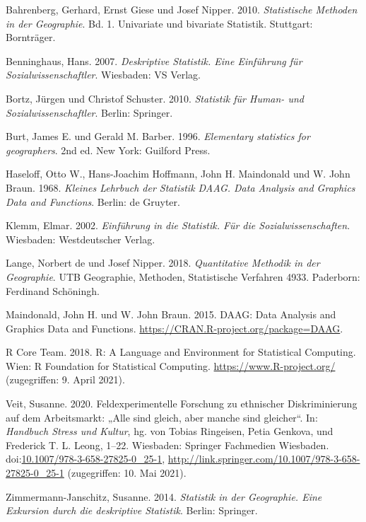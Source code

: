 \documentclass[
  11pt,
  ngerman,
  a4paper,
]{report}
\newlength{\cslhangindent}
\newenvironment{CSLReferences}[2] %
 {%
  \setlength{\parindent}{0pt}
  \ifodd #1 \everypar{\setlength{\hangindent}{\cslhangindent}}\ignorespaces\fi
  \ifnum #2 > 0
  \setlength{\parskip}{#2\baselineskip}
  \fi
 }%
 {}
\begin{document}
\hypertarget{refs}{}
\begin{CSLReferences}{1}{0}
\leavevmode{}%
Bahrenberg, Gerhard, Ernst Giese und Josef Nipper. 2010. \emph{Statistische Methoden in der Geographie}. Bd. 1. Univariate und bivariate Statistik. Stuttgart: Bornträger.

\leavevmode{}%
Benninghaus, Hans. 2007. \emph{Deskriptive Statistik. Eine Einführung für Sozialwissenschaftler}. Wiesbaden: VS Verlag.

\leavevmode{}%
Bortz, Jürgen und Christof Schuster. 2010. \emph{Statistik für Human- und Sozialwissenschaftler}. Berlin: Springer.

\leavevmode{}%
Burt, James E. und Gerald M. Barber. 1996. \emph{Elementary statistics for geographers}. 2nd ed. New York: Guilford Press.

\leavevmode{}%
Haseloff, Otto W., Hans-Joachim Hoffmann, John H. Maindonald und W. John Braun. 1968. \emph{Kleines Lehrbuch der Statistik DAAG. Data Analysis and Graphics Data and Functions}. Berlin: de Gruyter.

\leavevmode{}%
Klemm, Elmar. 2002. \emph{Einführung in die Statistik. Für die Sozialwissenschaften}. Wiesbaden: Westdeutscher Verlag.

\leavevmode{}%
Lange, Norbert de und Josef Nipper. 2018. \emph{Quantitative Methodik in der Geographie}. {UTB} Geographie, Methoden, Statistische Verfahren 4933. Paderborn: Ferdinand Schöningh.

\leavevmode{}%
Maindonald, John H. und W. John Braun. 2015. DAAG: Data Analysis and Graphics Data and Functions. \url{https://CRAN.R-project.org/package=DAAG}.

\leavevmode{}%
R Core Team. 2018. R: A Language and Environment for Statistical Computing. Wien: R Foundation for Statistical Computing. \url{https://www.R-project.org/} (zugegriffen: 9. April 2021).

\leavevmode{}%
Veit, Susanne. 2020. Feldexperimentelle {Forschung} zu ethnischer {Diskriminierung} auf dem {Arbeitsmarkt}: „{Alle} sind gleich, aber manche sind gleicher``. In: \emph{Handbuch {Stress} und {Kultur}}, hg. von Tobias Ringeisen, Petia Genkova, und Frederick T. L. Leong, 1--22. Wiesbaden: Springer Fachmedien Wiesbaden. doi:\href{https://doi.org/10.1007/978-3-658-27825-0_25-1}{10.1007/978-3-658-27825-0\_25-1}, \url{http://link.springer.com/10.1007/978-3-658-27825-0_25-1} (zugegriffen: 10. Mai 2021).

\leavevmode{}%
Zimmermann-Janschitz, Susanne. 2014. \emph{Statistik in der Geographie. Eine Exkursion durch die deskriptive Statistik}. Berlin: Springer.

\end{CSLReferences}
\end{document}
